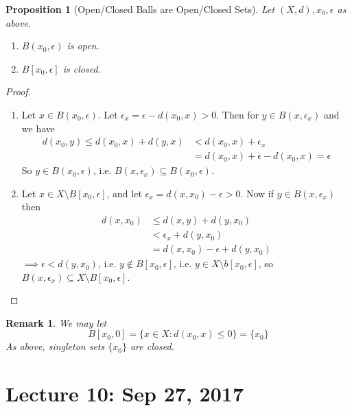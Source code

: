 \documentclass[11pt, oneside]{book}
\theoremstyle{break}
\newtheorem*{proof}{Proof}
\newtheorem{propo}{Proposition}[section]
\newtheorem*{remark}{Remark}
\begin{document}
\begin{propo}[Open/Closed Balls are Open/Closed Sets]
	Let $(X, d), x_0, \epsilon$ as above.
	\begin{enumerate}
		\item $B(x_0, \epsilon)$ is open.
		\item $B[x_0, \epsilon]$ is closed.
	\end{enumerate}
\end{propo}

\begin{proof}
	\begin{enumerate}
		\item Let $x \in B(x_0, \epsilon)$. Let $\epsilon_x = \epsilon - d(x_0, x) > 0$. Then for $y \in B(x, \epsilon_x)$ and we have
			\begin{align*}
				d(x_0, y) \leq d(x_0, x) + d(y, x) &< d(x_0, x) + \epsilon_x \\
						&= d(x_0, x) + \epsilon - d(x_0, x) = \epsilon
			\end{align*}
			So $y \in B(x_0, \epsilon)$, i.e. $B(x, \epsilon_x) \subseteq B(x_0, \epsilon)$.

		\item Let $x \in X \setminus B[x_0, \epsilon]$, and let $\epsilon_x = d(x, x_0) - \epsilon > 0$. Now if $y \in B(x, \epsilon_x)$ then
			\begin{align*}
				d(x, x_0) &\leq d(x,y) + d(y, x_0) \\
					&< \epsilon_x + d(y, x_0) \\
					&= d(x, x_0) - \epsilon + d(y, x_0)
			\end{align*}
			$\implies \epsilon < d(y, x_0)$, i.e. $y \notin B[x_0, \epsilon]$, i.e. $y \in X \setminus b[x_0, \epsilon]$, so $B(x, \epsilon_x) \subseteq X \setminus B[x_0, \epsilon]$.
	\end{enumerate}
\end{proof}

\begin{remark}
	We may let
	\begin{equation}
		B[x_0, 0] = \{x \in X : d(x_0, x) \leq 0 \} = \{x_0\}
	\end{equation}
	As above, singleton sets $\{x_0\}$ are closed.
\end{remark}

\chapter{Lecture 10: Sep 27, 2017}\label{chp:lec10}
\end{document}
